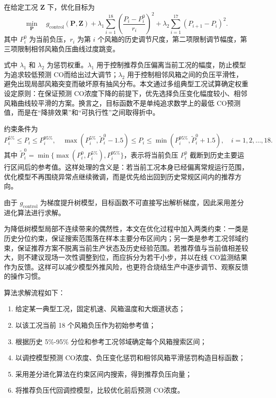 \documentclass[UTF8,a4paper,zihao=-4]{ctexart}
\newcommand{\CO}{CO}
\begin{document}
在给定工况 $\mathbf Z$ 下，优化目标为
\begin{equation}
\min_{\mathbf P}\quad g_{\mathrm{control}}(\mathbf P,\mathbf Z)+\lambda_1\sum_{i=1}^{18}\left(\frac{P_i-P_i^0}{r_i}\right)^2+\lambda_2\sum_{i=1}^{17}(P_{i+1}-P_i)^2.
\end{equation}
其中 $P_i^0$ 为当前负压，$r_i$ 为第 $i$ 个风箱的历史调节尺度，第二项限制调节幅度，第三项限制相邻风箱负压曲线过度跳变。

式中 $\lambda_1$ 和 $\lambda_2$ 为惩罚权重。$\lambda_1$ 用于控制推荐负压偏离当前工况的幅度，防止模型为追求较低预测 \CO 而给出过大调节；$\lambda_2$ 用于控制相邻风箱之间的负压平滑性，避免出现局部风箱突变而破坏原有抽风分布。本文通过多组典型工况试算确定权重设定原则：在保证预测 \CO 浓度下降的前提下，优先选择负压变化幅度较小、相邻风箱曲线较平滑的方案。换言之，目标函数不是单纯追求数学上的最低 \CO 预测值，而是在“降排效果”和“可执行性”之间取得折中。

约束条件为
\begin{equation}
P_i^{5\%}\leq P_i\leq P_i^{95\%},\quad
\max(P_i^{5\%},\tilde P_i^0-1.5)\leq P_i\leq \min(P_i^{95\%},\tilde P_i^0+1.5),
\quad i=1,2,\ldots,18.
\end{equation}
其中 $\tilde P_i^0=\min\{\max(P_i^0,P_i^{5\%}),P_i^{95\%}\}$，表示将当前负压 $P_i^0$ 截断到历史主要运行区间后的参考值。这样处理的含义是：若当前工况本身已经偏离常规运行范围，优化模型不再围绕异常点继续微调，而是优先给出回到历史常规区间内的推荐方向。

由于 $g_{\mathrm{control}}$ 为梯度提升树模型，目标函数不可直接写出解析梯度，因此采用差分进化算法进行求解\cite{storn1997differential}。

为降低树模型局部不连续带来的偶然性，本文在优化过程中加入两类约束：一类是历史分位约束，保证搜索范围落在样本主要分布区间内；另一类是参考工况邻域约束，保证推荐方案不脱离当前生产状态及历史经验范围。若推荐值与当前值相差较大，则不建议现场一次性调整到位，而应拆分为若干小步，并以在线 \CO 监测结果作为反馈。这样可以减少模型外推风险，也更符合烧结生产中逐步调节、观察反馈的操作习惯。

算法求解流程如下：

\begin{enumerate}
  \item 给定某一典型工况，固定机速、风箱温度和大烟道状态；
  \item 以该工况当前 18 个风箱负压作为初始参考值；
  \item 根据历史 5\%-95\% 分位和参考工况邻域确定每个风箱搜索区间；
  \item 以调控模型预测 \CO 浓度、负压变化惩罚和相邻风箱平滑惩罚构造目标函数；
  \item 采用差分进化算法在约束区间内搜索，得到推荐负压向量；
  \item 将推荐负压代回调控模型，比较优化前后预测 \CO 浓度。
\end{enumerate}
\end{document}
